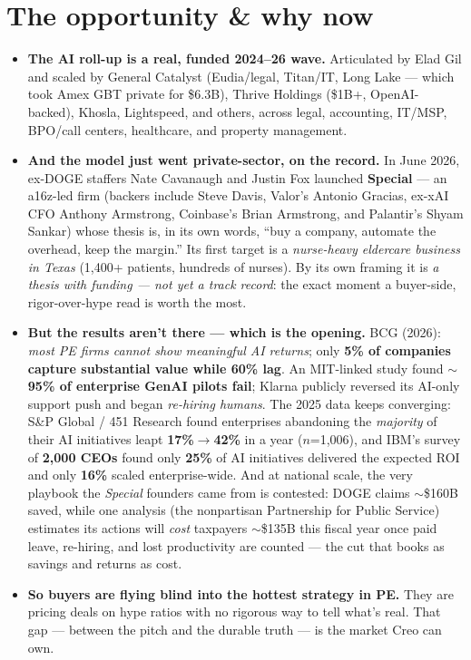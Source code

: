 \documentclass[11pt]{article}
\begin{document}
\section{The opportunity \& why now}
\begin{itemize}
  \item \textbf{The AI roll-up is a real, funded 2024--26 wave.} Articulated by Elad Gil and
  scaled by General Catalyst (Eudia/legal, Titan/IT, Long Lake --- which took Amex GBT private
  for \$6.3B), Thrive Holdings (\$1B+, OpenAI-backed), Khosla, Lightspeed, and others, across
  legal, accounting, IT/MSP, BPO/call centers, healthcare, and property management.
  \item \textbf{And the model just went private-sector, on the record.} In June 2026, ex-DOGE
  staffers Nate Cavanaugh and Justin Fox launched \textbf{Special} --- an a16z-led firm (backers
  include Steve Davis, Valor's Antonio Gracias, ex-xAI CFO Anthony Armstrong, Coinbase's Brian
  Armstrong, and Palantir's Shyam Sankar) whose thesis is, in its own words, ``buy a company,
  automate the overhead, keep the margin.'' Its first target is a \emph{nurse-heavy eldercare
  business in Texas} (1{,}400+ patients, hundreds of nurses). By its own framing it is
  \emph{a thesis with funding --- not yet a track record}: the exact moment a buyer-side,
  rigor-over-hype read is worth the most.
  \item \textbf{But the results aren't there --- which is the opening.} BCG (2026): \emph{most PE
  firms cannot show meaningful AI returns}; only \textbf{5\% of companies capture substantial
  value while 60\% lag}. An MIT-linked study found \textbf{$\sim$95\% of enterprise GenAI pilots
  fail}; Klarna publicly reversed its AI-only support push and began \emph{re-hiring humans}. The 2025 data keeps converging: S\&P Global / 451 Research found
  enterprises abandoning the \emph{majority} of their AI initiatives leapt \textbf{17\%$\to$42\%} in
  a year ($n$=1{,}006), and IBM's survey of \textbf{2{,}000 CEOs} found only \textbf{25\%} of AI
  initiatives delivered the expected ROI and only \textbf{16\%} scaled enterprise-wide. And
  at national scale, the very playbook the \emph{Special} founders came from is contested: DOGE
  claims $\sim$\$160B saved, while one analysis (the nonpartisan Partnership for Public Service)
  estimates its actions will \emph{cost} taxpayers $\sim$\$135B this fiscal year once paid leave,
  re-hiring, and lost productivity are counted --- the cut that books as savings and returns as cost.
  \item \textbf{So buyers are flying blind into the hottest strategy in PE.} They are pricing
  deals on hype ratios with no rigorous way to tell what's real. That gap --- between the pitch
  and the durable truth --- is the market Creo can own.
\end{itemize}
\end{document}
